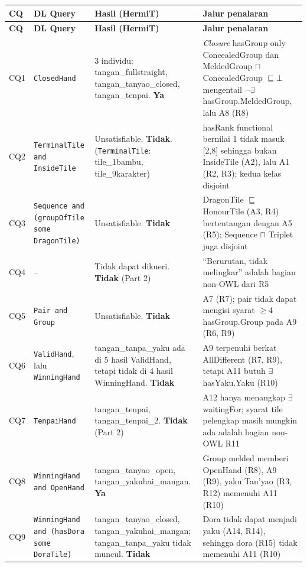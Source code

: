 \documentclass[11pt,a4paper]{article}
\begin{document}
{\small
\begin{longtable}{@{}p{0.9cm} p{4.1cm} p{4.0cm} p{5.0cm}@{}}
\toprule
\textbf{CQ} & \textbf{DL Query} & \textbf{Hasil (HermiT)} & \textbf{Jalur penalaran} \\
\midrule
\endfirsthead
\toprule
\textbf{CQ} & \textbf{DL Query} & \textbf{Hasil (HermiT)} & \textbf{Jalur penalaran} \\
\midrule
\endhead
CQ1 & \texttt{ClosedHand} & 3 individu: tangan\_fullstraight, tangan\_tanyao\_closed, tangan\_tenpai. \textbf{Ya} & \emph{Closure} hasGroup only ConcealedGroup dan MeldedGroup $\sqcap$ ConcealedGroup $\sqsubseteq \bot$ mengentail $\neg\exists$hasGroup.MeldedGroup, lalu A8 (R8) \\
CQ2 & \texttt{TerminalTile and InsideTile} & Unsatisfiable. \textbf{Tidak}. (\texttt{TerminalTile}: tile\_1bambu, tile\_9karakter) & hasRank functional bernilai 1 tidak masuk [2,8] sehingga bukan InsideTile (A2), lalu A1 (R2, R3); kedua kelas disjoint \\
CQ3 & \texttt{Sequence and (groupOfTile some DragonTile)} & Unsatisfiable. \textbf{Tidak} & DragonTile $\sqsubseteq$ HonourTile (A3, R4) bertentangan dengan A5 (R5); Sequence $\sqcap$ Triplet juga disjoint \\
CQ4 & -- & Tidak dapat dikueri. \textbf{Tidak} (Part 2) & ``Berurutan, tidak melingkar'' adalah bagian non-OWL dari R5 \\
CQ5 & \texttt{Pair and Group} & Unsatisfiable. \textbf{Tidak} & A7 (R7); pair tidak dapat mengisi syarat ${\geq}4$ hasGroup.Group pada A9 (R6, R9) \\
CQ6 & \texttt{ValidHand}, lalu \texttt{WinningHand} & tangan\_tanpa\_yaku ada di 5 hasil ValidHand, tetapi tidak di 4 hasil WinningHand. \textbf{Tidak} & A9 terpenuhi berkat AllDifferent (R7, R9), tetapi A11 butuh $\exists$hasYaku.Yaku (R10) \\
CQ7 & \texttt{TenpaiHand} & tangan\_tenpai, tangan\_tenpai\_2. \textbf{Tidak} (Part 2) & A12 hanya menangkap $\exists$waitingFor; syarat tile pelengkap masih mungkin ada adalah bagian non-OWL R11 \\
CQ8 & \texttt{WinningHand and OpenHand} & tangan\_tanyao\_open, tangan\_yakuhai\_mangan. \textbf{Ya} & Group melded memberi OpenHand (R8), A9 (R9), yaku Tan'yao (R3, R12) memenuhi A11 (R10) \\
CQ9 & \texttt{WinningHand and (hasDora some DoraTile)} & tangan\_tanyao\_closed, tangan\_yakuhai\_mangan; tangan\_tanpa\_yaku tidak muncul. \textbf{Tidak} & Dora tidak dapat menjadi yaku (A14, R14), sehingga dora (R15) tidak memenuhi A11 (R10) \\

\end{longtable}}
\end{document}
